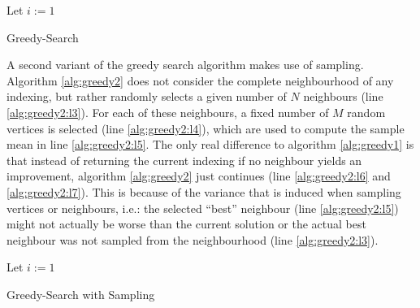 \begin{algorithm}[H]
    \SetAlgoLined
    \DontPrintSemicolon
    Let $i := 1$ \;
    \Return{$\idx$}
    \caption{Greedy-Search} \label{alg:greedy1}
\end{algorithm}

A second variant of the greedy search algorithm makes use of sampling. Algorithm \ref{alg:greedy2} does not consider the complete neighbourhood of any indexing, but rather randomly selects a given number of $N$ neighbours (line \ref{alg:greedy2:l3}). For each of these neighbours, a fixed number of $M$ random vertices is selected (line \ref{alg:greedy2:l4}), which are used to compute the sample mean in line \ref{alg:greedy2:l5}. The only real difference to algorithm \ref{alg:greedy1} is that instead of returning the current indexing if no neighbour yields an improvement, algorithm \ref{alg:greedy2} just continues (line \ref{alg:greedy2:l6} and \ref{alg:greedy2:l7}). This is because of the variance that is induced when sampling vertices or neighbours, i.e.: the selected ``best'' neighbour (line \ref{alg:greedy2:l5}) might not actually be worse than the current solution or the actual best neighbour was not sampled from the neighbourhood (line \ref{alg:greedy2:l3}).

\begin{algorithm}[H]
    \SetAlgoLined
    \DontPrintSemicolon
    Let $i := 1$ \label{alg:greedy2:l1} \;
    \Return{$\idx$}  \label{alg:greedy2:l9} 
    \caption{Greedy-Search with Sampling} \label{alg:greedy2}
\end{algorithm}

